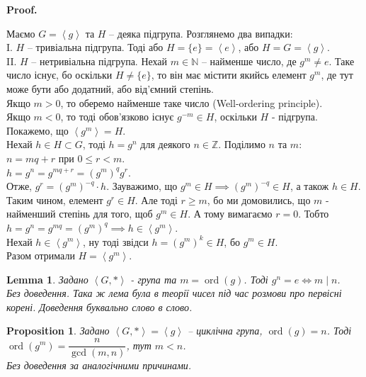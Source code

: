 \documentclass[a4paper, 10pt]{article}
\makeatletter
\theoremstyle{theoremdd}
\theoremstyle{theoremdd}
\theoremstyle{theoremdd}
\theoremstyle{theoremdd}
\theoremstyle{theoremdd}
\theoremstyle{theoremdd}
\theoremstyle{theoremdd}
\theoremstyle{theoremdd}
\theoremstyle{theoremdd}
\newtheorem{proposition}[theorem]{Proposition}
\theoremstyle{theoremdd}
\theoremstyle{theoremdd}
\theoremstyle{theoremdd}
\theoremstyle{theoremdd}
\newtheorem{lemma}[theorem]{Lemma}
\theoremstyle{theoremdd}
\theoremstyle{theoremdd}
\renewenvironment{proof}[1][Proof.\\]{\par
\pushQED{\hfill \qed}%
\normalfont \topsep6\p@\@plus6\p@\relax
\trivlist
\item\relax
{\bfseries
#1\@addpunct{.}}\hspace\labelsep\ignorespaces
}{%
\popQED\endtrivlist\@endpefalse
}
\DeclareMathOperator{\ord}{ord}
\makeatother
\begin{document}
\begin{proof}
Маємо $G = \left<g\right>$ та $H$ -- деяка підгрупа. Розглянемо два випадки:\\
I. $H$ -- тривіальна підгрупа. Тоді або $H = \{e\} = \left<e\right>$, або $H = G = \left<g\right>$.\\
II. $H$ -- нетривіальна підгрупа. Нехай $m \in \mathbb{N}$ -- найменше число, де $g^m \neq e$. Таке число існує, бо оскільки $H \neq \{e\}$, то він має містити якийсь елемент $g^m$, де тут може бути або додатний, або від'ємний степінь.\\
Якщо $m > 0$, то оберемо найменше таке число (Well-ordering principle).\\
Якщо $m < 0$, то тоді обов'язково існує $g^{-m} \in H$, оскільки $H$ - підгрупа.\\
Покажемо, що $\left<g^m\right> = H$.\\
Нехай $h \in H \subset G$, тоді $h = g^n$ для деякого $n \in \mathbb{Z}$. Поділимо $n$ та $m$:\\
$n = mq + r$ при $0 \leq r < m$.\\
$h = g^n = g^{mq+r} = (g^m)^q g^r$.\\
Отже, $g^r = (g^m)^{-q} \cdot h$. Зауважимо, що $g^m \in H \implies (g^m)^{-q} \in H$, а також $h \in H$. Таким чином, елемент $g^r \in H$. Але тоді $r \geq m$, бо ми домовились, що $m$ - найменший степінь для того, щоб $g^m \in H$. А тому вимагаємо $r = 0$. Тобто $h = g^n = g^{mq} = (g^m)^q \implies h \in \left<g^m\right>$.\\
Нехай $h \in \left<g^m\right>$, ну тоді звідси $h = (g^m)^k \in H$, бо $g^m \in H$.\\
Разом отримали $H = \left<g^m\right>$.
\end{proof}

\begin{lemma}
Задано $\left< G,* \right>$ - група та $m = \ord (g)$. Тоді $g^n = e \iff m \mid n$.\\
\textit{Без доведення. Така ж лема була в теорії чисел під час розмови про первісні корені. Доведення буквально слово в слово.}
\end{lemma}

\begin{proposition}
Задано $\left< G, * \right> = \left<g\right>$ -- циклічна група, $\ord (g) = n$. Тоді $\ord (g^m) =  \dfrac{n}{\gcd(m,n)}$, тут $m < n$.\\
\textit{Без доведення за аналогічними причинами.}
\end{proposition}
\end{document}
